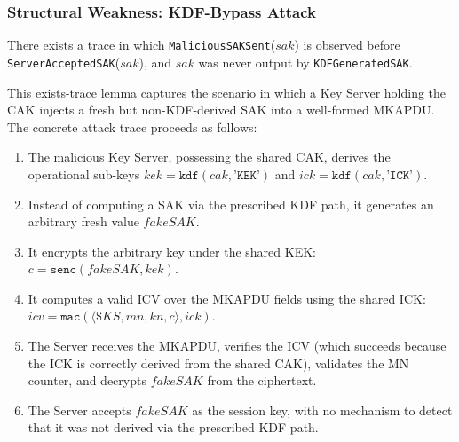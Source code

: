 \subsubsection{Structural Weakness: KDF-Bypass Attack}
\label{sec:weakness}

\begin{definition}
There exists a trace in which \texttt{MaliciousSAKSent}($sak$) is observed before \texttt{ServerAcceptedSAK}($sak$), and $sak$ was never output by \texttt{KDFGeneratedSAK}.
\end{definition}

\begin{sloppypar}
This exists-trace lemma captures the scenario in which a Key Server holding the CAK injects a fresh but non-KDF-derived SAK into a well-formed MKAPDU. The concrete attack trace proceeds as follows:
\end{sloppypar}

\begin{enumerate}
  \item The malicious Key Server, possessing the shared CAK, derives the operational sub-keys $\mathit{kek} = \mathtt{kdf}(\mathit{cak}, \texttt{'KEK'})$ and $\mathit{ick} = \mathtt{kdf}(\mathit{cak}, \texttt{'ICK'})$.
  \item Instead of computing a SAK via the prescribed KDF path, it generates an arbitrary fresh value $\mathit{fakeSAK}$.
  \item It encrypts the arbitrary key under the shared KEK:\\ $\mathit{c} = \mathtt{senc}(\mathit{fakeSAK}, \mathit{kek})$.
  \item It computes a valid ICV over the MKAPDU fields using the shared ICK: $\mathit{icv} = \mathtt{mac}(\langle \$\mathit{KS}, \mathit{mn}, \mathit{kn}, \mathit{c}\rangle, \mathit{ick})$.
  \item The Server receives the MKAPDU, verifies the ICV (which succeeds because the ICK is correctly derived from the shared CAK), validates the MN counter, and decrypts $\mathit{fakeSAK}$ from the ciphertext.
  \item The Server accepts $\mathit{fakeSAK}$ as the session key, with no mechanism to detect that it was not derived via the prescribed KDF path.
\end{enumerate}

